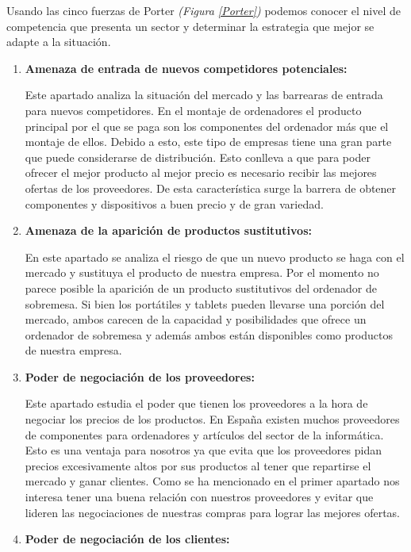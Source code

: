 Usando las cinco fuerzas de Porter \textit{(Figura \ref{Porter})} podemos conocer el nivel de competencia que presenta un sector y determinar la estrategia que mejor se adapte a la situación. 

\begin{enumerate}
    \item \textbf{Amenaza de entrada de nuevos competidores potenciales:}
    
    Este apartado analiza la situación del mercado y las barrearas de entrada para nuevos competidores. En el montaje de ordenadores el producto principal por el que se paga son los componentes del ordenador más que el montaje de ellos. Debido a esto, este tipo de empresas tiene una gran parte que puede considerarse de distribución. Esto conlleva a que para poder ofrecer el mejor producto al mejor precio es necesario recibir las mejores ofertas de los proveedores. De esta característica surge la barrera de obtener componentes y dispositivos a buen precio y de gran variedad.

    \item \textbf{Amenaza de la aparición de productos sustitutivos:}
    
    En este apartado se analiza el riesgo de que un nuevo producto se haga con el mercado y sustituya el producto de nuestra empresa. Por el momento no parece posible la aparición de un producto sustitutivos del ordenador de sobremesa. Si bien los portátiles y tablets pueden llevarse una porción del mercado, ambos carecen de la capacidad y posibilidades que ofrece un ordenador de sobremesa y además ambos están disponibles como productos de nuestra empresa.

    \item \textbf{Poder de negociación de los proveedores:}
    
    Este apartado estudia el poder que tienen los proveedores a la hora de negociar los precios de los productos. En España existen muchos proveedores de componentes para ordenadores y artículos del sector de la informática. Esto es una ventaja para nosotros ya que evita que los proveedores pidan precios excesivamente altos por sus productos al tener que repartirse el mercado y ganar clientes. Como se ha mencionado en el primer apartado nos interesa tener una buena relación con nuestros proveedores y evitar que lideren las negociaciones de nuestras compras para lograr las mejores ofertas.

    \item \textbf{Poder de negociación de los clientes:}
    

\end{enumerate}
